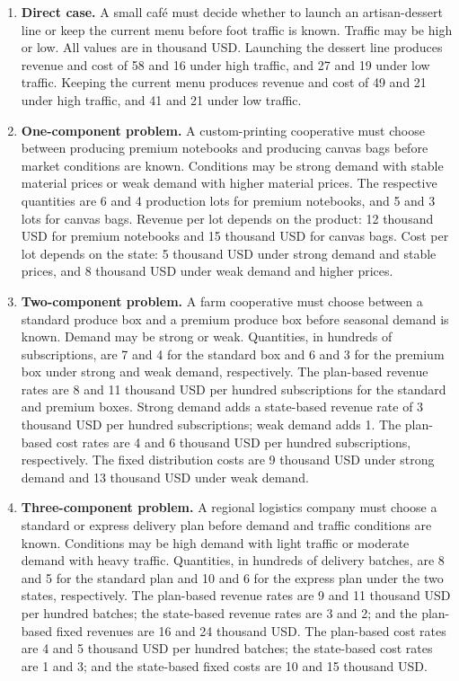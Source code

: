 	\begin{enumerate}[leftmargin=0.22in]
		\item \textbf{Direct case.}
		A small caf\'e must decide whether to launch an artisan-dessert line or keep
		the current menu before foot traffic is known. Traffic may be high or low.
		All values are in thousand USD. Launching the dessert line produces revenue
		and cost of 58 and 16 under high traffic, and 27 and 19 under low traffic.
		Keeping the current menu produces revenue and cost of 49 and 21 under high
		traffic, and 41 and 21 under low traffic.

		\item \textbf{One-component problem.}
		A custom-printing cooperative must choose between producing premium
		notebooks and producing canvas bags before market conditions are known.
		Conditions may be strong demand with stable material prices or weak demand
		with higher material prices. The respective quantities are 6 and 4
		production lots for premium notebooks, and 5 and 3 lots for canvas bags.
		Revenue per lot depends on the product: 12 thousand USD for premium
		notebooks and 15 thousand USD for canvas bags. Cost per lot depends on the
		state: 5 thousand USD under strong demand and stable prices, and 8 thousand
		USD under weak demand and higher prices.

		\item \textbf{Two-component problem.}
		A farm cooperative must choose between a standard produce box and a premium
		produce box before seasonal demand is known. Demand may be strong or weak.
		Quantities, in hundreds of subscriptions, are 7 and 4 for the standard box
		and 6 and 3 for the premium box under strong and weak demand, respectively.
		The plan-based revenue rates are 8 and 11 thousand USD per hundred
		subscriptions for the standard and premium boxes. Strong demand adds a
		state-based revenue rate of 3 thousand USD per hundred subscriptions; weak
		demand adds 1. The plan-based cost rates are 4 and 6 thousand USD per
		hundred subscriptions, respectively. The fixed distribution costs are 9
		thousand USD under strong demand and 13 thousand USD under weak demand.

		\item \textbf{Three-component problem.}
		A regional logistics company must choose a standard or express delivery plan
		before demand and traffic conditions are known. Conditions may be high
		demand with light traffic or moderate demand with heavy traffic. Quantities,
		in hundreds of delivery batches, are 8 and 5 for the standard plan and 10
		and 6 for the express plan under the two states, respectively. The
		plan-based revenue rates are 9 and 11 thousand USD per hundred batches; the
		state-based revenue rates are 3 and 2; and the plan-based fixed revenues are
		16 and 24 thousand USD. The plan-based cost rates are 4 and 5 thousand USD
		per hundred batches; the state-based cost rates are 1 and 3; and the
		state-based fixed costs are 10 and 15 thousand USD.
	\end{enumerate}


